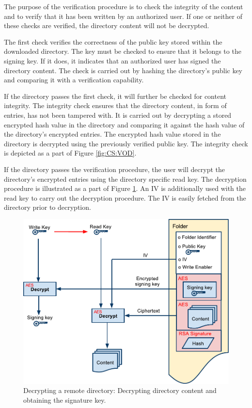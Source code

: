 \documentclass[pdftex,english,10pt,b5paper,twoside]{book}
\begin{document}
The purpose of the verification procedure is to check the integrity of the
content and to verify that it has been written by an authorized user.
If one or neither of these checks are verified, the directory content will not
be decrypted.

The first check verifies the correctness of the public key stored within the
downloaded directory. The key must be checked to ensure that it belongs to the signing
key. If it does, it indicates that an authorized user has signed the directory
content. The check is carried out by hashing the directory's public key and
comparing it with a verification capability.

If the directory passes the first check, it will further be checked for content
integrity. The integrity check ensures that the directory content, in form of
entries, has not been tampered with. It is carried out by decrypting a stored
encrypted hash value in the directory and comparing it against the hash value of
the directory's encrypted entries. The encrypted hash value stored in the
directory is decrypted using the previously verified public key. The integrity
check is depicted as a part of Figure \ref{fig:CS:VOD}.

If the directory passes the verification procedure, the user will decrypt the
directory's encrypted entries using the directory specific read key. The decryption procedure
is illustrated as a part of Figure \ref{fig:CS:OD}. An \ac{IV} is additionally
used with the read key to carry out the decryption procedure. The \ac{IV} is easily
fetched from the directory prior to decryption.

\begin{figure}[h!]
    \centering
    \includegraphics[width=\columnwidth]{OpenFolder.pdf}
    \caption{Decrypting a remote directory: Decrypting directory content and
    obtaining the signature key.}
    \label{fig:CS:OD}
\end{figure}
\end{document}
